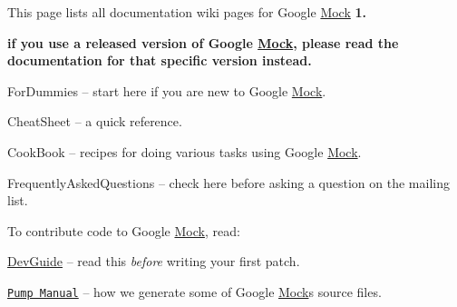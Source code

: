 This page lists all documentation wiki pages for Google \hyperlink{classMock}{Mock} {\bfseries 1.}
\begin{DoxyItemize}
\item {\bfseries if you use a released version of Google \hyperlink{classMock}{Mock}, please read the documentation for that specific version instead.}
\begin{DoxyItemize}
\item For\+Dummies -- start here if you are new to Google \hyperlink{classMock}{Mock}.
\item Cheat\+Sheet -- a quick reference.
\item Cook\+Book -- recipes for doing various tasks using Google \hyperlink{classMock}{Mock}.
\item Frequently\+Asked\+Questions -- check here before asking a question on the mailing list.
\end{DoxyItemize}
\end{DoxyItemize}

To contribute code to Google \hyperlink{classMock}{Mock}, read\+:


\begin{DoxyItemize}
\item \hyperlink{googletest_2docs_2DevGuide_8md}{Dev\+Guide} -- read this {\itshape before} writing your first patch.
\item \href{http://code.google.com/p/googletest/wiki/V1_6_PumpManual}{\tt Pump Manual} -- how we generate some of Google \hyperlink{classMock}{Mock}\textquotesingle{}s source files. 
\end{DoxyItemize}